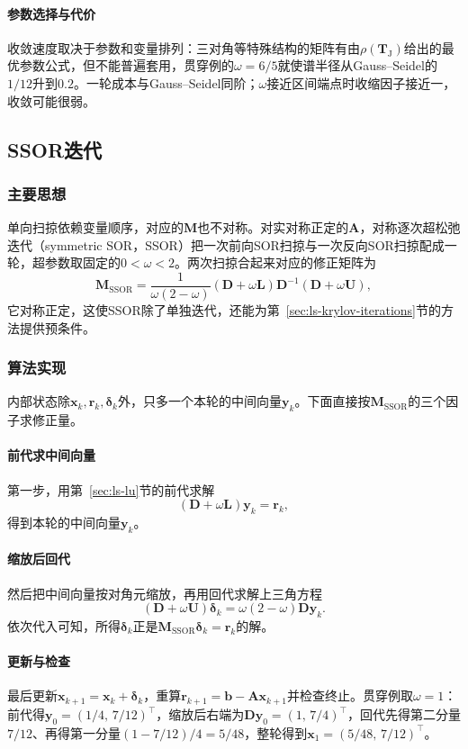 \paragraph{参数选择与代价}
收敛速度取决于参数和变量排列：三对角等特殊结构的矩阵有由$\rho(\bm T_{\mathrm J})$给出的最优参数公式，但不能普遍套用，贯穿例的$\omega=6/5$就使谱半径从Gauss--Seidel的$1/12$升到$0.2$。一轮成本与Gauss--Seidel同阶；$\omega$接近区间端点时收缩因子接近一，收敛可能很弱。

\subsection{SSOR迭代}
\label{sec:ls-ssor}

\subsubsection{主要思想}

单向扫掠依赖变量顺序，对应的$\bm M$也不对称。对实对称正定的$\bm A$，对称逐次超松弛迭代（symmetric SOR，SSOR）把一次前向SOR扫掠与一次反向SOR扫掠配成一轮，超参数取固定的$0<\omega<2$。两次扫掠合起来对应的修正矩阵为
\[
\bm M_{\mathrm{SSOR}}=\frac{1}{\omega(2-\omega)}(\bm D+\omega\bm L)\bm D^{-1}(\bm D+\omega\bm U),
\]
它对称正定，这使SSOR除了单独迭代，还能为第~\ref{sec:ls-krylov-iterations}节的方法提供预条件。

\subsubsection{算法实现}

内部状态除$\bm x_k,\bm r_k,\bm\delta_k$外，只多一个本轮的中间向量$\bm y_k$。下面直接按$\bm M_{\mathrm{SSOR}}$的三个因子求修正量。

\paragraph{前代求中间向量}
第一步，用第~\ref{sec:ls-lu}节的前代求解
\[
(\bm D+\omega\bm L)\bm y_k=\bm r_k ,
\]
得到本轮的中间向量$\bm y_k$。

\paragraph{缩放后回代}
然后把中间向量按对角元缩放，再用回代求解上三角方程
\[
(\bm D+\omega\bm U)\bm\delta_k=\omega(2-\omega)\bm D\bm y_k .
\]
依次代入可知，所得$\bm\delta_k$正是$\bm M_{\mathrm{SSOR}}\bm\delta_k=\bm r_k$的解。

\paragraph{更新与检查}
最后更新$\bm x_{k+1}=\bm x_k+\bm\delta_k$，重算$\bm r_{k+1}=\bm b-\bm A\bm x_{k+1}$并检查终止。贯穿例取$\omega=1$：前代得$\bm y_0=(1/4,\,7/12)^\top$，缩放后右端为$\bm D\bm y_0=(1,\,7/4)^\top$，回代先得第二分量$7/12$、再得第一分量$(1-7/12)/4=5/48$，整轮得到$\bm x_1=(5/48,\,7/12)^\top$。

